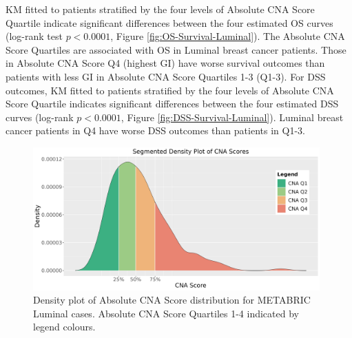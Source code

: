 KM fitted to patients stratified by the four levels of Absolute CNA Score Quartile indicate significant differences between the four estimated OS curves (log-rank test $p < 0.0001$, Figure \ref{fig:OS-Survival-Luminal}). The Absolute CNA Score Quartiles are associated with OS in Luminal breast cancer patients. Those in Absolute CNA Score Q4 (highest GI) have worse survival outcomes than patients with less GI in Absolute CNA Score Quartiles 1-3 (Q1-3). For DSS outcomes, KM fitted to patients stratified by the four levels of Absolute CNA Score Quartile indicates significant differences between the four estimated DSS curves (log-rank $p < 0.0001$, Figure \ref{fig:DSS-Survival-Luminal}). Luminal breast cancer patients in Q4 have worse DSS outcomes than patients in Q1-3. 

\begin{figure}[!h]
\centering
\includegraphics[width=0.98\textwidth]{../figures/Chapter_3/Luminal_AB_Score_Density.png}
\caption[Density plot of Absolute CNA Score distribution for METABRIC Luminal cases.]{Density plot of Absolute CNA Score distribution for METABRIC Luminal cases. Absolute CNA Score Quartiles 1-4 indicated by legend colours.}
\label{fig:Lum_Dense}
\end{figure}

